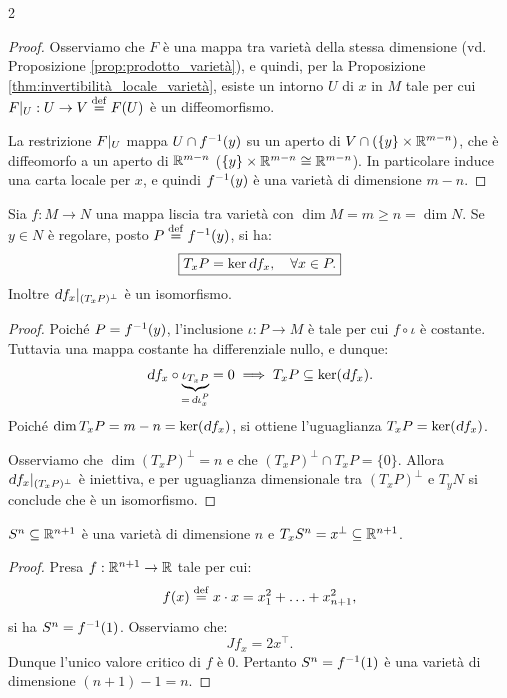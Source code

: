 \begin{multicols*}{2}
\begin{proof}
        Osserviamo che $F$ è una mappa tra varietà della stessa dimensione (vd. Proposizione
        \ref{prop:prodotto_varietà}), e quindi, per la Proposizione
        \ref{thm:invertibilità_locale_varietà}, esiste un intorno $U$ di $x$ in $M$ tale per cui
        $F\arrowvert_{U} : U \to V \overset{\mathrm{def}}{=} F(U)$ è un diffeomorfismo. \smallskip

        La restrizione $F\arrowvert_{U}$ mappa $U \cap f^{-1}(y)$ su un aperto di $V \cap (\{y\} \times \mathbb{R}^{m-n})$,
        che è diffeomorfo a un aperto di $\mathbb{R}^{m-n}$ ($\{y\} \times \mathbb{R}^{m-n} \cong \mathbb{R}^{m-n}$). In particolare
        induce una carta locale per $x$, e quindi $f^{-1}(y)$ è una varietà di dimensione $m-n$.
    \end{proof}

    \begin{proposition} \label{prop:tangente_valore_regolare}
        Sia $f : M \to N$ una mappa liscia tra varietà con $\dim M = m \geq n = \dim N$. Se
        $y \in N$ è regolare, posto $P \overset{\mathrm{def}}{=} f^{-1}(y)$, si ha:
        \[
            \boxed{T_x P = \ker \dif f_x, \quad \forall x \in P.}
        \]
        Inoltre $\restr{\dif f_x}{(T_x P)^\perp}$ è un isomorfismo.
    \end{proposition}

    \begin{proof}
        Poiché $P = f^{-1}(y)$, l'inclusione $\iota : P \to M$ è tale
        per cui $f \circ \iota$ è costante. Tuttavia una mappa costante
        ha differenziale nullo, e dunque:
        \[
            \dif f_x \circ \underbrace{\iota_{T_x P}}_{\mathclap{= \, \dif \iota^P_x}} = 0 \implies T_x P \subseteq \ker(\dif f_x).
        \]
        Poiché $\dim T_x P = m - n = \ker(\dif f_x)$, si ottiene
        l'uguaglianza $T_x P = \ker(\dif f_x)$. \smallskip

        Osserviamo che $\dim (T_x P)^\perp = n$ e che $(T_x P)^\perp \cap T_x P = \{0\}$.
        Allora $\restr{\dif f_x}{(T_x P)^\perp}$ è iniettiva, e per uguaglianza dimensionale
        tra $(T_x P)^\perp$ e $T_y N$ si conclude che è un isomorfismo.
    \end{proof}

    \begin{corollary} \label{cor:sn_è_varietà}
        $S^n \subseteq \mathbb{R}^{n+1}$ è una varietà di dimensione $n$ e $T_x S^n = x^\perp \subseteq \mathbb{R}^{n+1}$.
    \end{corollary}

    \begin{proof}
        Presa $f : \mathbb{R}^{n+1} \to \mathbb{R}$ tale per cui:
        \[
            f(x) \overset{\mathrm{def}}{=} x \cdot x = x_1^2 + \ldots + x_{n+1}^2,
        \]
        si ha $S^n = f^{-1}(1)$. Osserviamo che:
        \[
            Jf_x = 2x^\top.
        \]
        Dunque l'unico valore critico di $f$ è $0$. Pertanto
        $S^n = f^{-1}(1)$ è una varietà di dimensione $(n+1)-1 = n$. \smallskip


\end{proof}
\end{multicols*}
